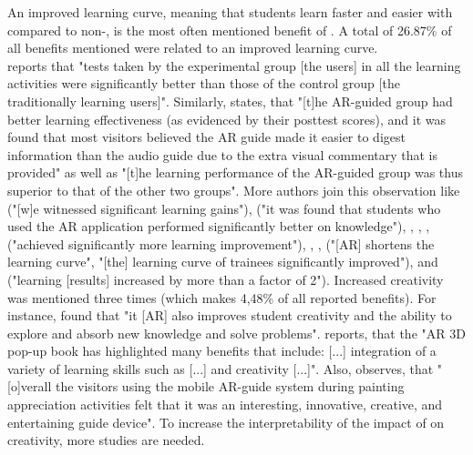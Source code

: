 An improved learning curve, meaning that students learn faster and easier with \AR \apps compared to non-\AR \appsns, is the most often mentioned benefit of \ARns. A total of 26.87\% of all benefits mentioned were related to an improved learning curve. \\
\cite{Liu.2009} reports that "tests taken by the experimental group [the \AR \app users] in all the learning activities were significantly better than those of the control group [the traditionally learning users]".\autocite[525]{Liu.2009} Similarly, \cite{Chang.2014} states, that "[t]he AR-guided group had better learning effectiveness (as evidenced by their posttest scores), and it was found that most visitors believed the AR guide made it easier to digest information than the audio guide due to the extra visual commentary that is provided"\autocite[193]{Chang.2014} as well as "[t]he learning performance of the AR-guided group was thus superior to
that of the other two groups"\autocite[190]{Chang.2014}. More authors join this observation like \cite{Kamarainen.2013} ("[w]e witnessed significant learning gains"\autocite[550]{Kamarainen.2013}), \cite{Ibanez.2014} ("it was found that students who used the AR application performed significantly better on knowledge"\autocite[12]{Ibanez.2014}), \cite{Li.2011}, \cite{MartinGutierrez.2011}, \cite{Redondo.2013}, \cite{Liu.2009b} ("achieved significantly more learning improvement"\autocite[173]{Liu.2009b}), \cite{Zhang.2014}, \cite{Yeo.2011}, \cite{Hou.2013} ("[AR] shortens the learning curve"\autocite[450]{Hou.2013}, "[the] learning curve of trainees significantly improved"\autocite[451]{Hou.2013}), \cite{Wilson.2013} and \cite{Anderson.2013} ("learning [results] increased by more than a factor of 2"\autocite[318]{Anderson.2013}). 
Increased creativity was mentioned three times (which makes 4,48\% of all reported benefits). For instance, \cite{Liu.2009b} found that "it [AR] also improves student creativity and the ability to explore and absorb new knowledge and solve problems"\autocite[173]{Liu.2009b}. \cite{VateULan.2012} reports, that the "AR 3D pop-up book has highlighted many benefits that include: [...] integration of a variety of learning skills such as [...] and creativity [...]"\autocite[894]{VateULan.2012}. Also, \cite{Chang.2014} observes, that "[o]verall the visitors using the mobile AR-guide system during painting appreciation activities felt that it was an interesting, innovative, creative, and entertaining guide device"\autocite[194]{Chang.2014}. To increase the interpretability of the impact of \AR \apps on creativity, more studies are needed.
% 
